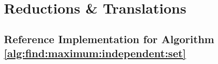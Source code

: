 \documentclass[]{article}
\begin{document}
\section{Reductions \& Translations }




%
%

\begin{appendices}
	\section{Reference Implementation for Algorithm \ref{alg:find:maximum:independent:set}}\label{sect:ref:implementation}
	
\end{appendices}
\end{document}
